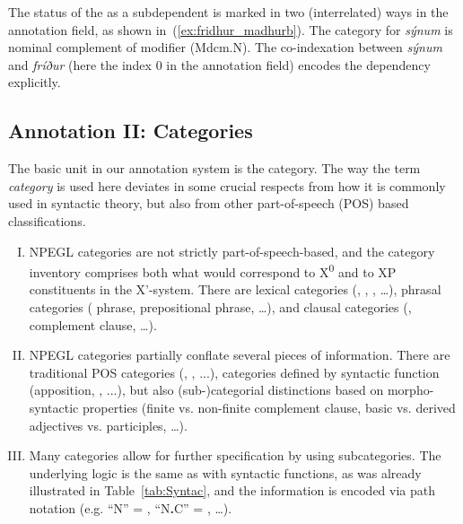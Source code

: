 \documentclass[output=paper,colorlinks,citecolor=brown]{langscibook}
\begin{document}
The status of the   as a subdependent is marked in two (interrelated) ways in the annotation field, as shown in~(\ref{ex:fridhur_madhurb}). The category for \textit{sýnum} is nominal complement of modifier (Mdcm.N). The co-indexation between \textit{sýnum} and \textit{fríður} (here the index 0 in the annotation field) encodes the dependency explicitly.








\subsection{Annotation II: Categories }
\label{sec:cat}
\label{sec:anno2}

The basic unit in our annotation system is the category. The way the term \textit{category} is used here deviates in some crucial respects from how it is commonly used in syntactic theory, but also from other part-of-speech (POS) based classifications. 
\begin{sloppypar}
\begin{enumerate}[(I)]
   \item NPEGL categories are not strictly part-of-speech-based, and the category inventory comprises both what would correspond to X\textsuperscript{0} and to XP constituents in the X'-system. There are lexical categories (, , , \ldots), phrasal categories (  phrase,  prepositional phrase, \ldots), and clausal categories (, complement clause, \ldots).
   

    \item NPEGL categories partially conflate several pieces of  information. There are traditional POS categories (, , ...), categories defined by syntactic function (apposition,   , ...), but also (sub-)categorial  distinctions based on morpho-syntactic properties (finite vs. non-finite complement clause, basic vs. derived adjectives vs. participles, \ldots). 

\item Many categories allow for further specification by using subcategories. The underlying logic is the same as with syntactic functions, as was already illustrated in Table~\ref{tab:Syntac}, and the information is encoded via path notation (e.g. ``N'' = , ``N\textbf{.}C'' = , \ldots).
\end{enumerate}
\end{sloppypar}
\end{document}
